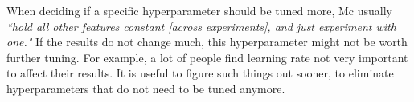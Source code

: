 \documentclass[preprint]{vgtc}        %
\begin{document}
When deciding if a specific hyperparameter should be tuned more, Mc usually \textit{“hold all other features constant [across experiments], and just experiment with one."} If the results do not change much, this hyperparameter might not be worth further tuning. For example, a lot of people find learning rate not very important to affect their results. It is useful to figure such things out sooner, to eliminate hyperparameters that do not need to be tuned anymore.
\end{document}
